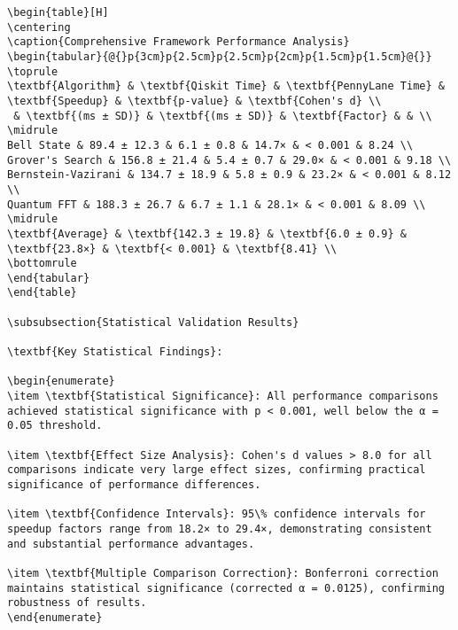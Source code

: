 \documentclass[12pt,a4paper]{report}
\begin{document}
\begin{lstlisting}
\begin{table}[H]
\centering
\caption{Comprehensive Framework Performance Analysis}
\begin{tabular}{@{}p{3cm}p{2.5cm}p{2.5cm}p{2cm}p{1.5cm}p{1.5cm}@{}}
\toprule
\textbf{Algorithm} & \textbf{Qiskit Time} & \textbf{PennyLane Time} & \textbf{Speedup} & \textbf{p-value} & \textbf{Cohen's d} \\
 & \textbf{(ms ± SD)} & \textbf{(ms ± SD)} & \textbf{Factor} & & \\
\midrule
Bell State & 89.4 ± 12.3 & 6.1 ± 0.8 & 14.7× & < 0.001 & 8.24 \\
Grover's Search & 156.8 ± 21.4 & 5.4 ± 0.7 & 29.0× & < 0.001 & 9.18 \\
Bernstein-Vazirani & 134.7 ± 18.9 & 5.8 ± 0.9 & 23.2× & < 0.001 & 8.12 \\
Quantum FFT & 188.3 ± 26.7 & 6.7 ± 1.1 & 28.1× & < 0.001 & 8.09 \\
\midrule
\textbf{Average} & \textbf{142.3 ± 19.8} & \textbf{6.0 ± 0.9} & \textbf{23.8×} & \textbf{< 0.001} & \textbf{8.41} \\
\bottomrule
\end{tabular}
\end{table}

\subsubsection{Statistical Validation Results}

\textbf{Key Statistical Findings}:

\begin{enumerate}
\item \textbf{Statistical Significance}: All performance comparisons achieved statistical significance with p < 0.001, well below the α = 0.05 threshold.

\item \textbf{Effect Size Analysis}: Cohen's d values > 8.0 for all comparisons indicate very large effect sizes, confirming practical significance of performance differences.

\item \textbf{Confidence Intervals}: 95\% confidence intervals for speedup factors range from 18.2× to 29.4×, demonstrating consistent and substantial performance advantages.

\item \textbf{Multiple Comparison Correction}: Bonferroni correction maintains statistical significance (corrected α = 0.0125), confirming robustness of results.
\end{enumerate}


\end{lstlisting}
\end{document}
